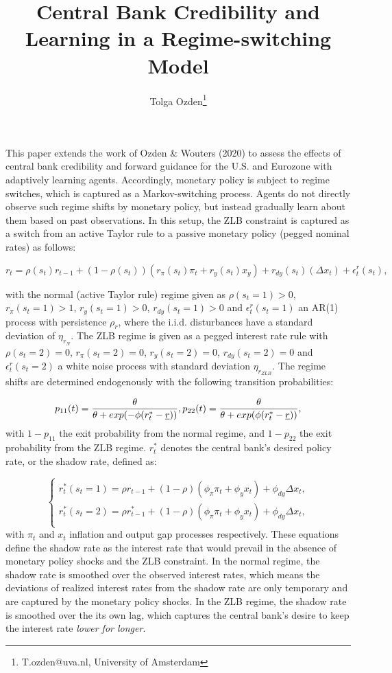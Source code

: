 \documentclass[11pt]{article}
\title{Central Bank Credibility and Learning in a Regime-switching Model}
\author{Tolga Ozden\footnote{T.ozden@uva.nl, University of Amsterdam}}
\numberwithin{equation}{section}
\begin{document}
\maketitle

This paper extends the work of Ozden \& Wouters (2020) to assess the effects of central bank credibility and forward guidance for the U.S. and Eurozone with adaptively learning agents. Accordingly, monetary policy is subject to regime switches, which is captured as a Markov-switching process. Agents do not directly observe such regime shifts by monetary policy, but instead gradually learn about them based on past observations. In this setup, the ZLB constraint is captured as a switch from an active Taylor rule to a passive monetary policy (pegged nominal rates) as follows: 

\begin{equation}
 r_t =  \rho(s_t) r_{t-1} + (1-\rho(s_t)) (r_{\pi}(s_t) \pi_t  + r_y(s_t) x_y ) + r_{dy}(s_t) (\Delta x_t)+ \epsilon_t^r(s_t), 
\end{equation}

with the normal (active Taylor rule) regime given as $\rho(s_t=1)>0$, $r_{\pi}(s_t=1)>1$, $r_y(s_t=1)>0$, $r_{dy}(s_t=1)>0$ and $\epsilon_t^r(s_t=1)$ an AR(1) process with persistence $\rho_r$, where the i.i.d. disturbances have a standard deviation of  $\eta_{r_N}$. The ZLB regime is given as a pegged interest rate rule with $\rho(s_t=2)=0$, $r_{\pi}(s_t=2)=0$, $r_y(s_t=2)=0$, $r_{dy}(s_t=2)=0$ and $\epsilon_t^r(s_t=2)$ a white noise process with standard deviation $\eta_{r_{ZLB}}$. The regime shifts are determined endogenously with the following transition probabilities: 

$$
p_{11}(t)= \frac{\theta}{\theta+exp(-\phi(r_t^{*}-\underline{r}))},  \\
p_{22}(t)= \frac{\theta}{\theta+exp(\phi(r_t^{*}-\underline{r}))}, 
$$
with $1-p_{11}$ the exit probability from the normal regime, and $1-p_{22}$ the exit probability from the ZLB regime. $r_t^{*}$ denotes the central bank's desired policy rate, or the shadow rate, defined as: 

$$
\begin{cases}
r_t^{*}(s_t=1)=\rho r_{t-1} + (1-\rho) (\phi_{\pi} \pi_t + \phi_y x_t) + \phi_{dy} \Delta x_t, \\
r_t^{*}(s_t=2)=\rho r_{t-1}^{*} + (1-\rho) (\phi_{\pi} \pi_t + \phi_y x_t) + \phi_{dy} \Delta x_t, \\
\end{cases}
$$
with $\pi_t$ and $x_t$ inflation and output gap processes respectively. These equations define the shadow rate as the interest rate that would prevail in the absence of monetary policy shocks and the ZLB constraint. In the normal regime, the shadow rate is smoothed over the observed interest rates, which means the deviations of realized interest rates from the shadow rate are only temporary and are captured by the monetary policy shocks. In the ZLB regime, the shadow rate is smoothed over the its own lag, which captures the central bank's desire to keep the interest rate \textit{lower for longer}. 
\end{document}
